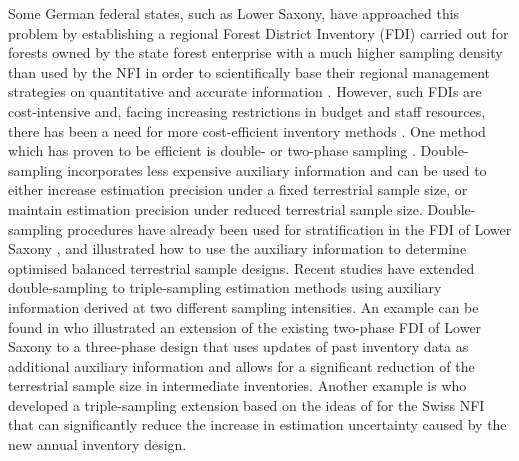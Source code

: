 \documentclass[remotesensing,article,submit,moreauthors,pdftex,10pt,a4paper]{mdpi}
\begin{document}
Some German federal states, such as Lower Saxony, have approached this problem by establishing a regional Forest District Inventory (FDI) carried out for forests owned by the state forest enterprise with a much higher sampling density than used by the NFI in order to scientifically base their regional management strategies on quantitative and accurate information \citep{bockmann1998}. However, such FDIs are cost-intensive and, facing increasing restrictions in budget and staff resources, there has been a need for more cost-efficient inventory methods \citep{vonluepke2013}. One method which has proven to be efficient is double- or two-phase sampling \citep{sarndal2003, gregoire2007, kohl2006, mandallaz2008}. Double-sampling incorporates less expensive auxiliary information and can be used to either increase estimation precision under a fixed terrestrial sample size, or maintain estimation precision under reduced terrestrial sample size. Double-sampling procedures have already been used for stratification in the FDI of Lower Saxony \citep{saborowski2010}, and \citet{grafstrom2017a} illustrated how to use the auxiliary information to determine optimised balanced terrestrial sample designs. Recent studies have extended double-sampling to triple-sampling estimation methods using auxiliary information derived at two different sampling intensities. An example can be found in \citet{vonLuepke2012} who illustrated an extension of the existing two-phase FDI of Lower Saxony to a three-phase design that uses updates of past inventory data as additional auxiliary information and allows for a significant reduction of the terrestrial sample size in intermediate inventories. Another example is \citet{massey2014a} who developed a triple-sampling extension based on the ideas of \citet{mandallaz2013c} for the Swiss NFI that can significantly reduce the increase in estimation uncertainty caused by the new annual inventory design.\par
\end{document}
